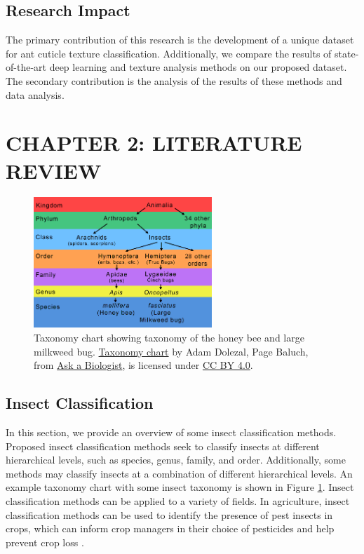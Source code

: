 \documentclass[12pt]{article}
\begin{document}
\subsection{Research Impact}

The primary contribution of this research is the development of a unique dataset
for ant cuticle texture classification. Additionally, we compare the results of
state-of-the-art deep learning and texture analysis methods on our proposed
dataset. The secondary contribution is the analysis of the results of these
methods and data analysis.
\FloatBarrier
\newpage
\section{CHAPTER 2: LITERATURE REVIEW}

\begin{figure}[h]
    \centering
    \includegraphics[width=0.6\textwidth]{assets/images/taxonomy-milkweed-bug.png}
    \caption{Taxonomy chart showing taxonomy of the honey bee and large milkweed
        bug. \href{https://askabiologist.asu.edu/sites/default/files/resources/articles/true_bugs/taxomomy-milkweed-bug.gif}{Taxonomy chart}
        by {Adam Dolezal, Page Baluch}, from
        \href{https://askabiologist.asu.edu/explore/true-bugs}{Ask a Biologist}, is licensed under
        \href{https://creativecommons.org/licenses/by/4.0/}{CC BY 4.0}.
    }
    \label{fig:taxonomy-chart}
\end{figure}

\subsection{Insect Classification}

In this section, we provide an overview of some insect classification methods.
Proposed insect classification methods seek to classify insects at different
hierarchical levels, such as species, genus, family, and order. Additionally,
some methods may classify insects at a combination of different hierarchical
levels. An example taxonomy chart with some insect taxonomy is shown in Figure
\ref{fig:taxonomy-chart}. Insect classification methods can be applied to a
variety of fields. In agriculture, insect classification methods can be used to
identify the presence of pest insects in crops, which can inform crop
managers in their choice of pesticides and help prevent crop loss
\cite{liu_pestnet_2019, kasinathan_machine_2021}.
\end{document}
